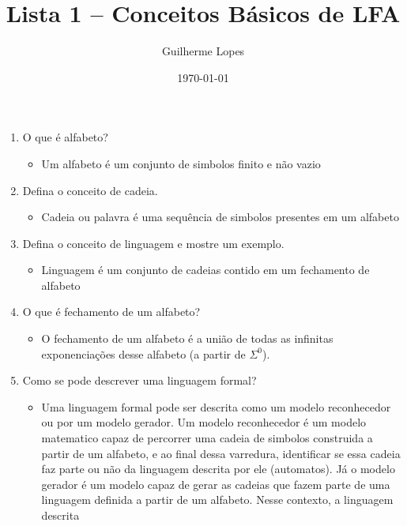\documentclass[12pt]{article}
\title{Lista 1 -- Conceitos Básicos de LFA}
\author{Guilherme Lopes}
\date{\today}
\begin{document}
\maketitle

    
\begin{enumerate}
    \item O que é alfabeto?
    \begin{itemize}[label=R:]
        \item Um alfabeto é um conjunto de simbolos finito e não vazio
    \end{itemize}
    \item Defina o conceito de cadeia.
    \begin{itemize}[label=R:]
        \item Cadeia ou palavra é uma sequência de simbolos presentes em um 
        alfabeto
    \end{itemize}
    \item Defina o conceito de linguagem e mostre um exemplo.
    \begin{itemize}[label=R:]
        \item Linguagem é um conjunto de cadeias contido em um fechamento de 
        alfabeto
    \end{itemize}
    \item O que é fechamento de um alfabeto?
    \begin{itemize}[label=R:]
        \item O fechamento de um alfabeto é a união de todas as infinitas 
        exponenciações desse alfabeto (a partir de $\Sigma^0$). 
    \end{itemize}
    \item Como se pode descrever uma linguagem formal?
    \begin{itemize}[label=R:]
        \item Uma linguagem formal pode ser descrita como um modelo reconhecedor 
        ou por um modelo gerador. Um modelo reconhecedor é um modelo matematico 
        capaz de percorrer uma cadeia de simbolos construida a partir de um 
        alfabeto, e ao final dessa varredura, identificar se essa cadeia faz 
        parte ou não da linguagem descrita por ele (automatos). Já o modelo gerador é um 
        modelo capaz de gerar as cadeias que fazem parte de uma linguagem 
        definida a partir de um alfabeto. Nesse contexto, a linguagem descrita 

\end{itemize}
\end{enumerate}
\end{document}

